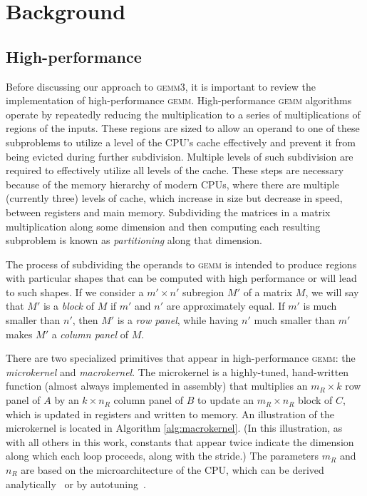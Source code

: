 \documentclass[12pt]{article}
\newcommand*{\gemmt}{{\textsc{gemm3}}}
\newcommand*{\gemm}{{\textsc{gemm}}}
\newcommand*{\mycite}[1]{~\cite{#1}}
\begin{document}
\section{Background}
\subsection{High-performance {\cmunicode \gemm{}}}
Before discussing our approach to \gemmt{}, it is important to review the implementation of high-performance \gemm{}.
High-performance \gemm{} algorithms operate by repeatedly reducing the multiplication to a series of multiplications of regions of the inputs.
These regions are sized to allow an operand to one of these subproblems to utilize a level of the CPU's cache effectively and prevent it from being evicted during further subdivision.
Multiple levels of such subdivision are required to effectively utilize all levels of the cache.
These steps are necessary because of the memory hierarchy of modern CPUs, where there are multiple (currently three) levels of cache, which increase in size but decrease in speed, between registers and main memory.
Subdividing the matrices in a matrix multiplication along some dimension and then computing each resulting subproblem is known as \emph{partitioning} along that dimension.

The process of subdividing the operands to \gemm{} is intended to produce regions with particular shapes that can be computed with high performance or will lead to such shapes.
If we consider a $m' \times n'$ subregion $M'$ of a matrix $M$, we will say that $M'$ is a \emph{block} of $M$ if $m'$ and $n'$ are approximately equal.
If $m'$ is much smaller than $n'$, then $M'$ is a \emph{row panel}, while having $n'$ much smaller than $m'$ makes $M'$ a \emph{column panel} of $M$.

There are two specialized primitives that appear in high-performance \gemm{}: the \emph{microkernel} and \emph{macrokernel}.
The microkernel is a highly-tuned, hand-written function (almost always implemented in assembly) that multiplies an $m_R \times k$ row panel of $A$ by an $k \times n_R$ column panel of $B$ to update an $m_R \times n_R$ block of $C$, which is updated in registers and written to memory.
An illustration of the microkernel is located in Algorithm \ref{alg:macrokernel}.
(In this illustration, as with all others in this work, constants that appear twice indicate the dimension along which each loop proceeds, along with the stride.)
The parameters $m_R$ and $n_R$ are based on the microarchitecture of the CPU, which can be derived analytically\mycite{Low2016} or by autotuning\mycite{Whaley1998}.
\end{document}
